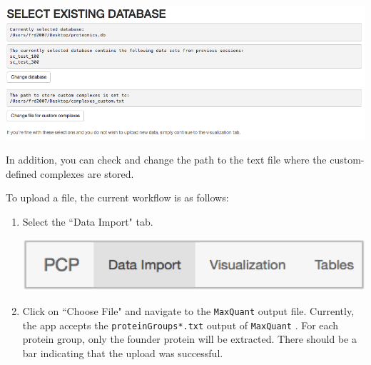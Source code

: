 \documentclass[letterpaper, twocolumn, 9pt]{article}
\begin{document}
\includegraphics[width=.98\columnwidth,trim={0 0 17cm 0},clip]{figures/ss_selectDB.png}

In addition, you can check and change the path to the text file where the custom-defined complexes are stored.

To upload a file, the current workflow is as follows:
\begin{enumerate}
\item{Select the \textsf{``Data Import"} tab.

\includegraphics[width=.75\columnwidth]{figures/ss_appOverview.png}}

\item{ Click on \textsf{``Choose File"} and navigate to the \texttt{MaxQuant} output file.
Currently, the app accepts the \texttt{proteinGroups*.txt} output of \texttt{MaxQuant} \citep{MQ2008, MQ2012}.
For each protein group, only the founder protein will be extracted.
 There should be a bar indicating that the upload was successful.

}
\end{enumerate}
\end{document}
